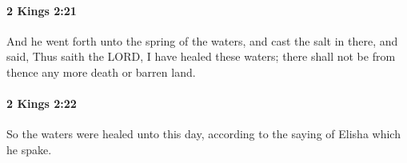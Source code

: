 		\paragraph{2 Kings 2:21} %
			\label{2KINGS-2-21}

			And he went forth unto the spring of the waters, and cast the salt in there, and said, Thus saith the LORD, I have healed these waters; there shall not be from thence any more death or barren land.


		\paragraph{2 Kings 2:22} %
			\label{2KINGS-2-22}

			So the waters were healed unto this day, according to the saying of Elisha which he spake.


